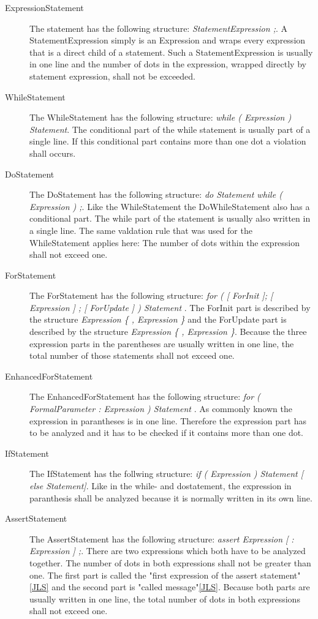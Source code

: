 \begin{description}
  \item[ExpressionStatement] The statement has the following structure: \textit{ StatementExpression ;}. A StatementExpression simply is an Expression and wraps every expression that is a direct child of a statement. Such a StatementExpression is usually in one line and the number of dots in the expression, wrapped directly by statement expression, shall not be exceeded.
  \item[WhileStatement] The WhileStatement  has the following structure: \textit{while ( Expression ) Statement}. The conditional part of the while statement is usually part of a single line. If this conditional part contains more than one dot a violation shall occurs.
  \item[DoStatement] The DoStatement has the following structure: \textit{do Statement while ( Expression ) ;}. Like the WhileStatement the DoWhileStatement also has a conditional part. The while part of the statement is usually also written in a single line. The same valdation rule that was used for the WhileStatement applies here: The number of dots within the expression shall not exceed one.
  \item[ForStatement] The ForStatement has the following structure: \textit{for ( [ ForInit ]; [ Expression ] ; [ ForUpdate ] ) Statement  
  }. The ForInit part is described by the structure \textit{Expression \{ , Expression \}} and the ForUpdate  part is described by the structure \textit{ Expression \{ , Expression \}}. Because the three expression parts in the parentheses are usually written in one line, the total number of those statements shall not exceed one. 
  \item[EnhancedForStatement] The EnhancedForStatement has the following structure: \textit{for ( FormalParameter : Expression ) Statement }. As commonly known the expression in parantheses is in one line. Therefore the expression part has to be analyzed and it has to be checked if it contains more than one dot.
  \item[IfStatement] The IfStatement has the follwing structure: \textit{if ( Expression ) Statement [ else Statement]}. Like in the while- and dostatement, the expression in paranthesis shall be analyzed because it is normally written in its own line. 
  \item[AssertStatement] The AssertStatement  has the following structure: \textit{assert Expression [ : Expression ] ;}. There are two expressions which both have to be analyzed together. The number of dots in both expressions shall not be greater than one. The first part is called the "first expression of the assert statement"\ref{JLS} and the second part is "called message"\ref{JLS}. Because both parts are usually written in one line, the total number of dots in both expressions shall not exceed one.

\end{description}
